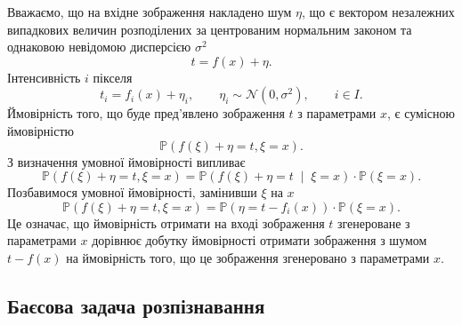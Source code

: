 Вважаємо,
що на вхідне зображення накладено шум $\eta$,
що є вектором незалежних випадкових величин
розподілених за центрованим нормальним законом
та однаковою невідомою дисперсією $\sigma^2$
\begin{equation*}
  t = f\left( x \right) + \eta.
\end{equation*}
Інтенсивність $i$ пікселя
\begin{equation*}
  t_i = f_i\left( x \right) + \eta_i,\qquad
  \eta_i \sim \mathcal{N}\left( 0, \sigma^2 \right), \qquad
  i \in I.
\end{equation*}
Ймовірність того, що буде пред'явлено зображення $t$ з параметрами $x$,
є сумісною ймовірністю
\begin{equation*}
  \mathbb{P}\left( f\left( \xi \right) + \eta = t, \xi = x \right).
\end{equation*}
З визначення умовної ймовірності випливає
\begin{equation*}
  \mathbb{P}\left( f\left( \xi \right) + \eta = t, \xi = x \right)
  = \mathbb{P}\left( f\left( \xi \right) + \eta = t
                    \;\middle|\; \xi = x \right)
    \cdot \mathbb{P}\left( \xi = x \right).
\end{equation*}
Позбавимося умовної ймовірності, замінивши $\xi$ на $x$
\begin{equation*}
  \mathbb{P}\left( f\left( \xi \right) + \eta = t, \xi = x \right)
  = \mathbb{P}\left( \eta = t - f_i\left( x \right) \right)
    \cdot \mathbb{P}\left( \xi = x \right).
\end{equation*}
Це означає,
що ймовірність отримати на вході зображення $t$ згенероване з параметрами $x$
дорівнює добутку ймовірності отримати зображення з шумом $t - f\left( x \right)$
на ймовірність того, що це зображення згенеровано з параметрами $x$.

\subsection{Баєсова задача розпізнавання}


